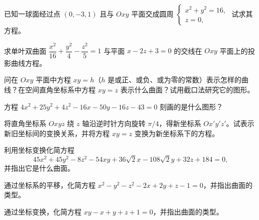 \newpage
\noindent\begin{minipage}{\textwidth}
已知一球面经过点 $(0,-3,1)$ 且与 $Oxy$ 平面交成圆周 $\begin{cases}x^2+y^2=16,\\z=0,\end{cases}$ 试求其方程。
\end{minipage}\par\vfill
\noindent\begin{minipage}{\textwidth}
求单叶双曲面 $\dfrac{x^2}{16}+\dfrac{y^2}{4}-\dfrac{z^2}{5}=1$ 与平面 $x-2z+3=0$ 的交线在 $Oxy$ 平面上的投影曲线方程。
\end{minipage}\par\vfill
\noindent\begin{minipage}{\textwidth}
问在 $Oxy$ 平面中方程 $xy=h$（$h$ 是或正、或负、或为零的常数）表示怎样的曲线？在空间直角坐标系中方程 $xy=z$ 表示什么曲面？试用截口法研究它的图形。
\end{minipage}\par\vfill
\noindent\begin{minipage}{\textwidth}
方程 $4x^2+25y^2+4z^2-16x-50y-16z-43=0$ 刻画的是什么图形？
\end{minipage}\par\vfill
\newpage
\noindent\begin{minipage}{\textwidth}
将直角坐标系 $Oxyz$ 绕 $z$ 轴沿逆时针方向旋转 $\pi/4$，得新坐标系 $Ox'y'z'$。试表示新旧坐标间的变换关系，并将方程 $xy=z$ 变换为新坐标系下的方程。
\end{minipage}\par\vfill
\noindent\begin{minipage}{\textwidth}
利用坐标变换化简方程 \[45x^2+45y^2-8z^2-54xy+36\sqrt2x-108\sqrt2y+32z+184=0,\] 并指出它是什么曲面。
\end{minipage}\par\vfill
\noindent\begin{minipage}{\textwidth}
通过坐标系的平移，化简方程 $x^2-y^2-z^2-2x+2y+z-1=0$，并指出曲面的类型。
\end{minipage}\par\vfill
\noindent\begin{minipage}{\textwidth}
通过坐标变换，化简方程 $xy-x+y+z+1=0$，并指出曲面的类型。
\end{minipage}\par\vfill
